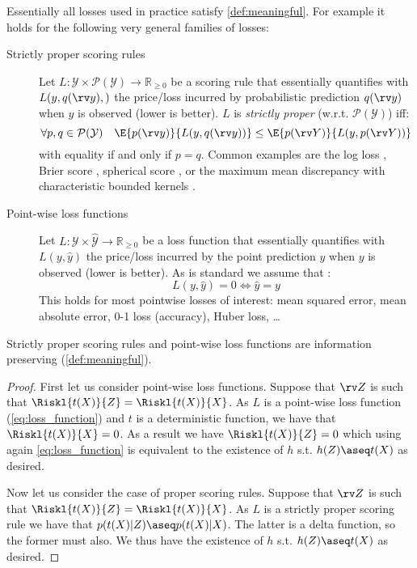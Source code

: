 \documentclass[final]{article}
\begin{document}
Essentially all losses used in practice satisfy \cref{def:meaningful}.
For example it holds for the following very general families of losses:
\begin{description}
\item[Strictly proper scoring rules] Let $L : \mathcal Y \times \mathcal{P}(\mathcal{Y})  \to \mathbb{R}_{\geq 0}$ be a scoring rule that essentially quantifies with $L(y, q(\rv y),)$ the price/loss incurred by probabilistic prediction $q(\rv y)$ when $y$ is observed (lower is better).
$L$ is \textit{strictly proper} \cite{gneiting_strictly_2007} (w.r.t. $\mathcal{P}(\mathcal{Y})$) iff:
\begin{equation}\label{eq:strict_proper}
\forall p,q \in \mathcal{P}(\mathcal{Y}) \quad \E{p(\rv y)}{L(y,q(\rv y))} \leq \E{p(\rv Y)}{L(y,p(\rv Y))}
\end{equation}
with equality if and only if $p=q$.
Common examples are the log loss \cite{good_rational_1952}, 
Brier score \cite{brier_verification_1950}, spherical score \cite{good_comment_1971}, or the maximum mean discrepancy with characteristic bounded kernels \cite{sriperumbudur_injective_2008,huszar_scoring_2013}.
\item[Point-wise loss functions] Let $L :  \mathcal Y \times \hat{\mathcal{ Y}}  \to \mathbb{R}_{\geq 0}$ be a loss function that essentially quantifies with $L(y,\hat y)$ the price/loss incurred by the point prediction $\hat y$ when $y$ is observed (lower is better).
As is standard \cite{gneiting_making_2010} we assume that :
\begin{equation}\label{eq:loss_function}
L(y,\hat y)=0 \iff \hat y = y
\end{equation}
This holds for most pointwise losses of interest: mean squared error, mean absolute error, 0-1 loss (accuracy), Huber loss, \dots 
\end{description}

\begin{lemma}
Strictly proper scoring rules and point-wise loss functions are information preserving (\cref{def:meaningful}).
\end{lemma}
\begin{proof}
First let us consider point-wise loss functions.
Suppose that $\rv Z$ is such that $\Riskl{t(X)}{Z} = \Riskl{t(X)}{X}$.
As $L$ is a point-wise loss function (\cref{eq:loss_function}) and $t$ is a deterministic function, we have that $\Riskl{t(X)}{X} = 0$.
As a result we have $\Riskl{t(X)}{Z}=0$ which using again \cref{eq:loss_function} is equivalent to the existence of $h$ s.t.   $h(Z) \aseq t(X)$ as desired.


Now let us consider the case of proper scoring rules.
Suppose that $\rv Z$ is such that $\Riskl{t(X)}{Z} = \Riskl{t(X)}{X}$.
As $L$ is a strictly proper scoring rule we have that $p(t(X) | Z) \aseq p(t(X) | X)$. 
The latter is a delta function, so the former must also. We thus have the existence of $h$ s.t.   $h(Z) \aseq t(X)$ as desired.
\end{proof}
\end{document}
